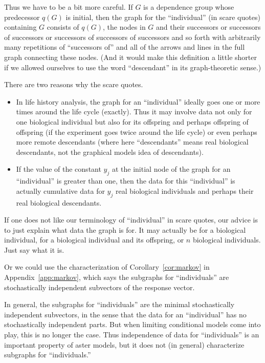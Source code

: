 Thus we have to be a bit more careful.  If $G$ is a dependence group whose
predecessor $q(G)$ is initial, then the graph for the ``individual''
(in scare quotes) containing $G$ consists of $q(G)$, the nodes in $G$
and their successors or successors of successors or successors of successors
of successors and so forth with arbitrarily many repetitions
of ``successors of'' and all of the arrows and lines in the full graph
connecting these nodes.
(And it would make this definition a little shorter
if we allowed ourselves to use the word ``descendant'' in its graph-theoretic
sense.)

There are two reasons why the scare quotes.
\begin{itemize}
\item In life history
analysis, the graph for an ``individual'' ideally goes one or more times
around the life cycle (exactly).  Thus it may involve data not only for
one biological individual but also for its offspring and perhaps offspring
of offspring (if the experiment goes twice around the life cycle) or even
perhaps more remote descendants (where here ``descendants'' means real
biological descendants, not the graphical models idea of descendants).
\item If the value of the constant $y_j$ at the initial node of the
graph for an ``individual'' is greater than one, then the data for this
``individual'' is actually cumulative data for $y_j$ real biological
individuals and perhaps their real biological descendants.
\end{itemize}


If one does not like our terminology of ``individual'' in scare quotes,
our advice is to just explain what data the graph is for.  It may actually
be for a biological individual, for a biological individual
and its offspring, or $n$ biological individuals.  Just say what it is.

Or we could use the characterization of Corollary~\ref{cor:markov} in
Appendix~\ref{app:markov}, which says the subgraphs for ``individuals''
are stochastically independent subvectors of the response vector.

In general, the subgraphs for ``individuals'' are the minimal stochastically
independent subvectors, in the sense that the data for an ``individual'' has
no stochastically independent parts.  But when limiting conditional models
come into play, this is no longer the case.
Thus independence of data for ``individuals'' is an important property of
aster models, but it does not (in general) characterize
subgraphs for ``individuals.''

